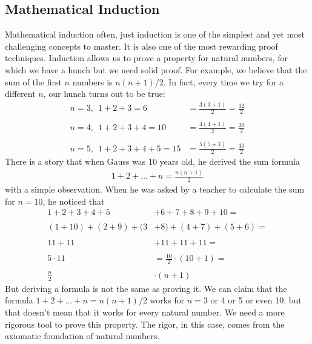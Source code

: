 \documentclass[letterpaper,10pt,english]{sphinxmanual}
\begin{document}
\subsection{Mathematical Induction}
\label{\detokenize{COMP163/notes/induction:mathematical-induction}}\label{\detokenize{COMP163/notes/induction::doc}}
Mathematical induction \textendash{} often, just induction \textendash{} is one of the simplest and yet most challenging concepts to master. It is also one of the most rewarding proof techniques. Induction allows us to prove a property for natural numbers, for which we have a hunch but we need solid proof. For example, we believe that the sum of the first \(n\) numbers is \(n(n+1)/2\). In fact, every time we try for a different \(n\), our hunch turns out to be true:
\begin{equation*}
\begin{split}n=3,\ \ 1+2+3 = 6 &= \frac{3(3+1)}{2}=\frac{12}{2} \\ \\
n=4,\ \ 1+2+3+4 = 10 &= \frac{4(4+1)}{2}=\frac{20}{2} \\ \\
n=5,\ \ 1+2+3+4+5 = 15 &= \frac{5(5+1)}{2}=\frac{30}{2}\end{split}
\end{equation*}
There is a story that when Gauss was 10 years old, he derived the sum formula
\begin{equation*}
\begin{split}1+2+\ldots+n = \frac{n(n+1)}{2}\end{split}
\end{equation*}
with a simple observation. When he was asked by a teacher to calculate the sum for \(n=10\), he noticed that
\begin{equation*}
\begin{split}1+2+3+4+5&+6+7+8+9+10 = \\ \\
(1+10) + (2+9) + (3&+8) + (4+7) + (5+6) = \\ \\
11     + 11    &+ 11     + 11    + 11 = \\ \\
5\cdot 11 & = \frac{10}{2}\cdot (10+1)= \\ \\
\frac{n}{2}&\cdot (n+1)\end{split}
\end{equation*}
But deriving a formula is not the same as proving it. We can claim that the formula \(1+2+\ldots+n = n(n+1)/2\) works for \(n=3\) or 4 or 5 or even 10, but that doesn’t mean that it works for every natural number. We need a more rigorous tool to prove this property. The rigor, in this case, comes from the axiomatic foundation of natural numbers.
\end{document}
